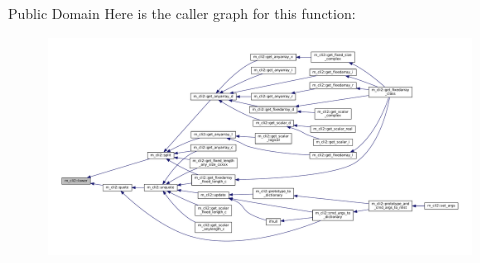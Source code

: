 Public Domain Here is the caller graph for this function\+:\nopagebreak
\begin{figure}[H]
\begin{center}
\leavevmode
\includegraphics[width=350pt]{namespacem__cli2_a6d2d93ab8471667e632bf7a0e95ebd13_icgraph}
\end{center}
\end{figure}
\mbox{\label{namespacem__cli2_a2d1a2b245e9a5e5897e5bff0afc2a217}} 
